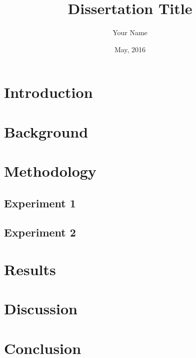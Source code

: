 \documentclass[beng,nohyphen,noindent]{bangoree}
\title{Dissertation Title}
\author{Your Name}
\date{May, 2016}
\begin{document}
\maketitle
\statements
\abstract{\lipsum[90-92]}
\acknowledgements{\lipsum[1]}
\tables

\content
\chapter{Introduction}
\lipsum[1-9]

\chapter{Background}
\lipsum[10-14]

\chapter{Methodology}
\section{Experiment 1}
\lipsum[20-22]
\section{Experiment 2}
\lipsum[22-24]

\chapter{Results}
\lipsum[50-53]

\chapter{Discussion}
\lipsum[55-58]

\chapter{Conclusion}
\lipsum[60]

\end{document}
